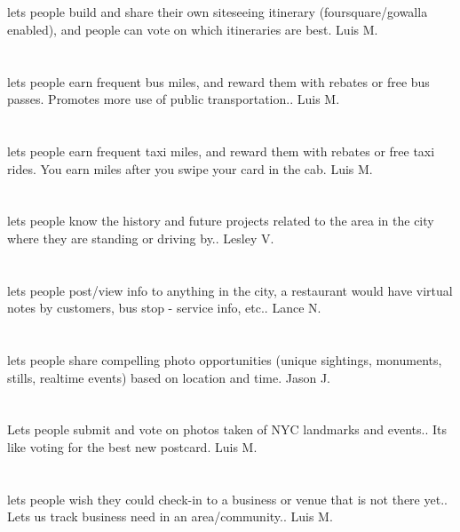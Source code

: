 \section{}  lets people build and share their own siteseeing itinerary (foursquare/gowalla enabled),  and people can vote on which itineraries are best. Luis M.
\section{}lets people earn frequent bus miles,  and reward them with rebates or free bus passes. Promotes more use of public transportation.. Luis M.
\section{}lets people earn frequent taxi miles,  and reward them with rebates or free taxi rides. You earn miles after you swipe your card in the cab. Luis M.
\section{}lets people know the history and future projects related to the area in the city where they are standing or driving by.. Lesley V.
\section{}lets people post/view info to anything in the city,  a restaurant would have virtual notes by customers,  bus stop - service info,  etc.. Lance N.
\section{}lets people share compelling photo opportunities (unique sightings,  monuments,  stills,  realtime events) based on location and time. Jason J.
\section{}Lets people submit and vote on photos taken of NYC landmarks and events.. Its like voting for the best new postcard. Luis M.
\section{}lets people wish they could check-in to a business or venue that is not there yet.. Lets us track business need in an area/community.. Luis M.
